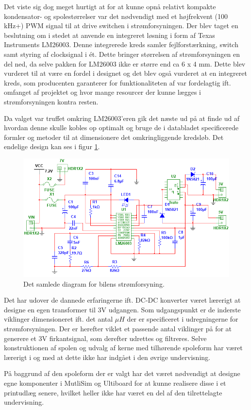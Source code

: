 Det viste sig dog meget hurtigt at for at kunne opnå relativt kompakte kondensator- og spolestørrelser var det nødvendigt med et højfrekvent (100 kHz+) PWM signal til at drive switchen i strømforsyningen.
Der blev taget en beslutning om i stedet at anvende en integreret løsning i form af Texas Instruments LM26003\cite{lib:lm26003}. 
Denne integrerede kreds samler fejlforstærkning, switch samt styring af clocksignal i ét.
Dette bringer størrelsen af strømforsyningen en del ned, da selve pakken for LM26003 ikke er større end ca 6 x 4 mm.
Dette blev vurderet til at være en fordel i designet og det blev også vurderet at en integreret kreds, som producenten garanterer for funktionaliteten af var fordelagtig ift. omfanget af projektet og hvor mange resourcer der kunne lægges i strømforsyningen kontra resten.

Da valget var truffet omkring LM26003'eren gik det næste ud på at finde ud af hvordan denne skulle kobles op optimalt og bruge de i databladet specificerede formler og metoder til at dimensionere det omkringliggende kredsløb.
Det endelige design kan ses i figur \ref{fig:bil_psu}.

\begin{figure}[h]
\centering
\includegraphics[width=\textwidth]{../fig/diagrammer/bil/psu_kredsloeb}
\caption{Det samlede diagram for bilens strømforsyning.}
\label{fig:bil_psu}
\end{figure}

Det har udover de dannede erfaringerne ift. DC-DC konverter været lærerigt at designe en egen transformer til 3V udgangen. 
Som udgangspunkt er de inderste viklinger dimensioneret ift. det antal $\mu H$ der er specificeret i udregningerne\cite{lib:psu_calcs} for strømforsyningen.
Der er herefter viklet et passende antal viklinger på for at generere et 3V firkantsignal, som derefter udrettes og filtreres.
Selve konstruktionen af spolen og udvalg af kerne med tilhørende spoleform har været lærerigt i og med at dette ikke har indgået i den øvrige undervisning.

På baggrund af den spoleform der er valgt har det været nødvendigt at designe egne komponenter i MutliSim og Ultiboard for at kunne realisere disse i et printudlæg senere, hvilket heller ikke har været en del af den tilrettelagte undervisning.
